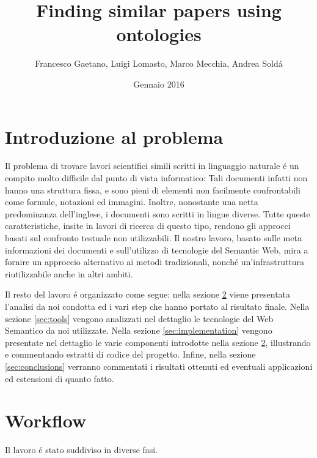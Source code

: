 \documentclass[11pt,a4paper]{article}
\begin{document}
\title{Finding similar papers using ontologies}
\author{Francesco Gaetano, Luigi Lomasto, Marco Mecchia, Andrea Sold\'a }
\date{Gennaio 2016}

\maketitle
\tableofcontents
\newpage
\section{Introduzione al problema}
Il problema di trovare lavori scientifici simili scritti in linguaggio naturale \'e un compito molto difficile dal punto di vista informatico: Tali documenti infatti non hanno una struttura fissa, e sono pieni  di elementi non facilmente confrontabili come formule, notazioni ed immagini. Inoltre, nonostante una netta predominanza dell'inglese, i documenti sono scritti in lingue diverse. Tutte queste caratteristiche, insite in lavori di ricerca di questo tipo, rendono gli approcci basati sul confronto testuale non utilizzabili. Il nostro lavoro, basato sulle meta informazioni dei documenti e sull'utilizzo di tecnologie del Semantic Web, mira a fornire un approccio alternativo ai metodi tradizionali, nonch\'e un'infrastruttura riutilizzabile anche in altri ambiti.

Il resto del lavoro \'e organizzato come segue: nella sezione \ref{sec:workflow} viene presentata l'analisi da noi condotta ed i vari step che hanno portato al risultato finale. Nella sezione \ref{sec:tools} vengono analizzati nel dettaglio le tecnologie del Web Semantico da noi utilizzate. Nella sezione \ref{sec:implementation} vengono presentate nel dettaglio le varie componenti introdotte nella sezione \ref{sec:workflow}, illustrando e commentando estratti di codice del progetto. Infine, nella sezione \ref{sec:conclusions} verranno commentati i risultati ottenuti ed eventuali applicazioni ed estensioni di quanto fatto.

\section{Workflow}
\label{sec:workflow}
Il lavoro \'e stato suddiviso in diverse fasi. 
\end{document}
